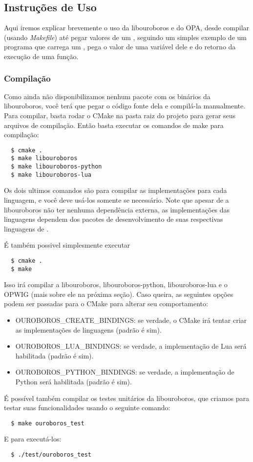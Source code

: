 \subsection{Instruções de Uso}
Aqui iremos explicar brevemente o uso da libouroboros e do OPA, desde compilar
(usando \textit{Makefile}) até pegar valores de um \script{}, seguindo um 
simples exemplo de um programa que carrega um \script{}, pega o valor de uma
variável dele e do retorno da execução de uma função.

\subsubsection{Compilação} 
Como ainda não disponibilizamos nenhum pacote
com os binários da libouroboros, você terá que pegar o código fonte dela
e compilá-la manualmente. Para compilar, basta rodar o CMake na pasta 
raiz do projeto para gerar seus arquivos de compilação. Então basta 
executar os comandos de make para compilação:
\begin{verbatim}
  $ cmake .
  $ make libouroboros
  $ make libouroboros-python
  $ make libouroboros-lua
\end{verbatim}
Os dois ultimos comandos são para compilar as implementações para cada linguagem,
e você deve usá-los somente se necessário. Note que apesar de a libouroboros não
ter nenhuma dependência externa, as implementações das linguagens dependem dos
pacotes de desenvolvimento de suas respectivas linguagens de \script{}.

É também possivel simplesmente executar
\begin{verbatim}
  $ cmake .
  $ make
\end{verbatim}
Isso irá compilar a libouroboros, libouroboros-python, libouroboros-lua e o OPWIG
(mais sobre ele na próxima seção). Caso queira, as seguintes opções podem ser
passadas para o CMake para alterar seu comportamento:
\begin{itemize}
  \item OUROBOROS\_CREATE\_BINDINGS: se verdade, o CMake irá tentar criar as 
    implementações de linguagens (padrão é sim).
  \item OUROBOROS\_LUA\_BINDINGS: se verdade, a implementação de Lua será habilitada (padrão é sim).
  \item OUROBOROS\_PYTHON\_BINDINGS: se verdade, a implementação de Python será habilitada (padrão é sim).
\end{itemize}

É possível também compilar os testes unitários da libouroboros, que
criamos para testar suas funcionalidades usando o seguinte comando:
\begin{verbatim}
  $ make ouroboros_test
\end{verbatim}
E para executá-los:
\begin{verbatim}
  $ ./test/ouroboros_test
\end{verbatim}
    
